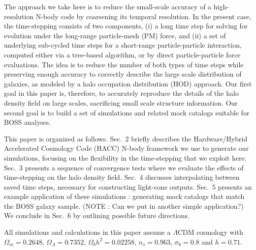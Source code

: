 The approach we take here is to reduce the small-scale accuracy of
a high-resolution N-body code by coarsening its temporal resolution.
In the present case, the time-stepping consists of two components,
(i) a long time step for solving for evolution under the long-range
particle-mesh (PM) force, and (ii) a set of underlying sub-cycled
time steps for a short-range particle-particle interaction, computed
either via a tree-based algorithm, or by direct particle-particle
force evaluations. The idea is to reduce the number of both types
of time steps while preserving enough accuracy to correctly describe
the large scale distribution of galaxies, as modeled by a halo occupation
distribution (HOD) approach. Our first goal in this paper is, therefore,
to accurately reproduce the details of the halo density field on large
scales, sacrificing small scale structure information. Our second
goal is to build a set of simulations and related mock catalogs suitable
for BOSS analyses.


This paper is organized as follows. Sec.~2 briefly describes the Hardware/Hybrid
Accelerated Cosmology Code (HACC) N-body framework we use to generate our
simulations, focusing on the flexibility in the time-stepping that we exploit here. 
Sec.~3 presents a sequence of convergence tests where we evaluate the effects
of time-stepping on the halo density field. Sec.~4 discusses interpolating between
saved time steps, necessary for constructing light-cone outputs. Sec.~5 presents
an example application of these simulations : generating mock catalogs that 
match the BOSS galaxy sample. (NOTE : Can we put in another simple application?) 
We conclude in Sec.~6 by outlining possible future directions.

All simulations and calculations in this paper assume a $\Lambda$CDM
cosmology with $\Omega_{m}=0.2648$, $\Omega_{\Lambda}=0.7352$, $\Omega_{b}h^{2}=0.02258$,
$n_{s}=0.963$, $\sigma_{8}=0.8$ and $h=0.71$.

